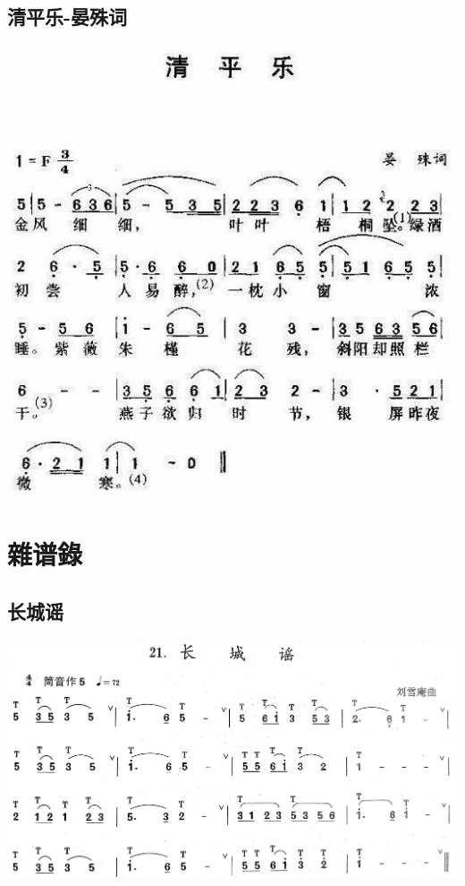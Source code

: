 \documentclass[cn,pad,chinesefont=nofont,twocol]{elegantbook}
\begin{document}
\section{清平乐-晏殊词}
    \includegraphics[width=\textwidth]{dongxiao/20200411-清平乐-晏殊.jpg}
                      
\chapter{雜谱錄}
\section{长城谣}
    \includegraphics[width=\textwidth]{dongxiao/20200711-长城谣.jpg}
\end{document}
